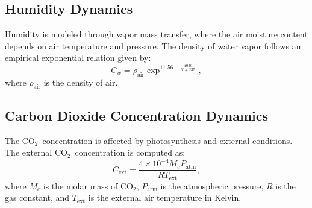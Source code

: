 \documentclass[conference]{IEEEtran}
\newcommand{\coo}{\ensuremath{\mathrm{CO_2}}}
\begin{document}

\subsection{Humidity Dynamics}\label{subsec:humidity}

Humidity is modeled through vapor mass transfer, where the air moisture content depends on air temperature and pressure. The density of water vapor follows an empirical exponential relation given by:
\begin{equation}
    C_w = \rho_{\text{air}} \exp^{11.56 - \frac{4030}{T + 235}},
\end{equation}
where \(\rho_{\text{air}}\) is the density of air.


\subsection{Carbon Dioxide Concentration Dynamics}

The \coo\ concentration is affected by photosynthesis and external conditions. The external \coo\ concentration is computed as:
\begin{equation}
    C_{\text{ext}} = \frac{4 \times 10^{-4}  M_c  P_{\text{atm}}}{R  T_{\text{ext}}},
\end{equation}
where \(M_c\) is the molar mass of \coo, \(P_{\text{atm}}\) is the atmospheric pressure, \(R\) is the gas constant, and \(T_{\text{ext}}\) is the external air temperature in Kelvin.
\end{document}
